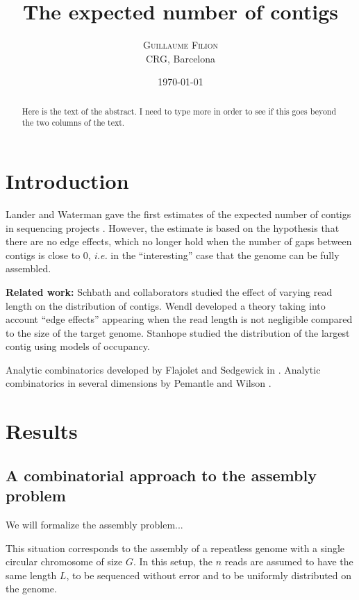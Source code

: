 \documentclass{article}
\title{The expected number of contigs}
\author{
\textsc{Guillaume Filion} \\ [1ex]
\normalsize CRG, Barcelona
}
\date{\today}
\begin{document}
\maketitle

\begin{abstract}
Here is the text of the abstract. I need to type more in order to see if
this goes beyond the two columns of the text.
\end{abstract}



\section{Introduction}

Lander and Waterman gave the first estimates of the expected number of
contigs in sequencing projects \cite{pmid3294162}. However, the estimate
is based on the hypothesis that there are no edge effects, which no longer
hold when the number of gaps between contigs is close to 0, \textit{i.e.}
in the ``interesting'' case that the genome can be fully assembled.

\textbf{Related work:} Schbath and collaborators \cite{pmid10890387}
studied the effect of varying read length on the distribution of contigs.
Wendl \cite{pmid16901236} developed a theory taking into account ``edge
effects'' appearing when the read length is not negligible compared to the
size of the target genome. Stanhope \cite{pmid20686599} studied the
distribution of the largest contig using models of occupancy.

Analytic combinatorics developed by Flajolet and Sedgewick in
\cite{AnalComb2009}. Analytic combinatorics in several dimensions by
Pemantle and Wilson \cite{AnalComb2013}.

\section{Results}

\subsection{A combinatorial approach to the assembly problem}

We will formalize the assembly problem...

This situation corresponds to the assembly of a repeatless genome with a
single circular chromosome of size $G$. In this setup, the $n$ reads are
assumed to have the same length $L$, to be sequenced without error  and to
be uniformly distributed on the genome.
\end{document}
